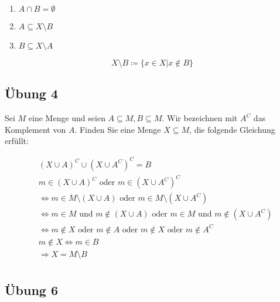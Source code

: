 \documentclass{article}
\begin{document}
\begin{enumerate}
\item $A \cap B = \emptyset$
\item $A \subseteq X \setminus B$
\item $B \subseteq X \setminus A$
\end{enumerate}

\[
  X \setminus B \coloneqq \{ x \in X | x \notin B\}
\]


\subsection*{Übung 4}

Sei $M$ eine Menge und seien $A \subseteq M, B \subseteq M$. Wir bezeichnen mit $A^C$ das Komplement von $A$.
Finden Sie eine Menge $X \subseteq M$, die folgende Gleichung erfüllt:

\begin{align*}
  &(X \cup A)^C \cup (X \cup A^C)^C = B \\
  &m \in (X \cup A)^C \text{ oder } m \in (X \cup A^C)^C \\
  &\iff m \in M \setminus (X \cup A) \text{ oder } m \in M \setminus (X \cup A^C) \\
  &\iff m \in M \text{ und } m \notin (X \cup A) \text{ oder } m \in M \text{ und } m \notin (X \cup A^C) \\
  &\iff m \notin X \text{ oder } m \notin A \text{ oder } m \notin X \text{ oder } m \notin A^C \\
  &m \notin X \iff m \in B \\
  &\Rightarrow X = M \setminus B \\
\end{align*}


\subsection*{Übung 6}
\end{document}
